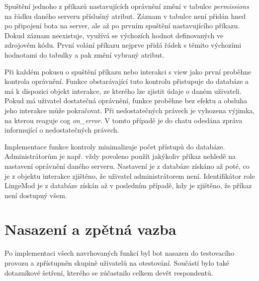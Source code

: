\documentclass[FM]{tulthesis}
\begin{document}
	Spuštění jednoho z příkazů nastavujících oprávnění změní v tabulce \textit{permissions} na řádku daného serveru příslušný atribut. Záznam v tabulce není přidán hned po připojení bota na server, ale až po prvním spuštění nastavujícího příkazu. Dokud záznam neexistuje, využívá se výchozích hodnot definovaných ve zdrojovém kódu. První volání příkazu nejprve přidá řádek s těmito výchozími hodnotami do tabulky a pak změní vybraný atribut.
	
	Při každém pokusu o spuštění příkazu nebo interakci s view jako první proběhne kontrola oprávnění. Funkce obstarávající tuto kontrolu přistupuje do databáze a má k dispozici objekt interakce, ze kterého lze zjistit údaje o daném uživateli. Pokud má uživatel dostatečná oprávnění, funkce proběhne bez efektu a obsluha jeho interakce může pokračovat. Při nedostatečných právech je vyhozena výjimka, na kterou reaguje cog \textit{on\_error}. V tomto případě je do chatu odeslána zpráva informující o nedostatečných právech.
	
	Implementace funkce kontroly minimalizuje počet přístupů do databáze. Administrátorům je např. vždy povoleno použít jakýkoliv příkaz nehledě na nastavení oprávnění daného serveru. Nastavení je z databáze získáno až poté, co je z objektu interakce zjištěno, že uživatel administrátorem není. Identifikátor role LingeMod je z databáze získán až v posledním případě, kdy je zjištěno, že příkaz není dostupný všem.
	
		
	\section{Nasazení a zpětná vazba}
	
	Po implementaci všech navrhovaných funkcí byl bot nasazen do testovacího provozu a zpřístupněn skupině uživatelů na otestování. Součástí bylo také dotazníkové šetření, kterého se zúčastnilo celkem devět respondentů.
	
	$ $%
	
\end{document}
